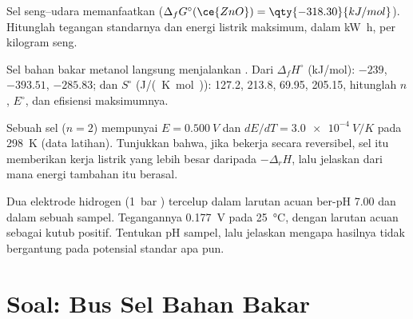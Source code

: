 \begin{exercise}[$\star\star$]\label{exo:b2:cell-thermodynamics:9}
Sel seng--udara memanfaatkan 
($\Delta_f G^\circ(\ce{ZnO}) =
\qty{-318.30}{kJ/mol}$). Hitunglah tegangan
standarnya dan energi listrik maksimum, dalam \unit{kW.h}, per kilogram
seng.
\end{exercise}

\begin{exercise}[$\star\star\star$]\label{exo:b2:cell-thermodynamics:10}
Sel bahan bakar metanol langsung menjalankan
. Dari $\Delta_f H^\circ$
(\unit{kJ/mol}):  $-239$,  $-393.51$, 
$-285.83$; dan $S^\circ$ (\unit{J/(K.mol)}):  127.2, 
213.8,  69.95,  205.15, hitunglah $n$, $E^\circ$, dan
efisiensi maksimumnya.
\end{exercise}

\begin{exercise}[$\star\star\star$]\label{exo:b2:cell-thermodynamics:11}
Sebuah sel ($n = 2$) mempunyai $E = \qty{0.500}{V}$ dan
$dE/dT = \qty{+3.0e-4}{V/K}$ pada \qty{298}{K} (data latihan). Tunjukkan
bahwa, jika bekerja secara reversibel, sel itu memberikan kerja listrik
yang lebih besar daripada $-\Delta_r H$, lalu jelaskan dari mana energi
tambahan itu berasal.
\end{exercise}

\begin{exercise}[$\star\star\star$]\label{exo:b2:cell-thermodynamics:12}
Dua elektrode hidrogen (\qty{1}{bar} ) tercelup dalam larutan acuan
ber-pH 7.00 dan dalam sebuah sampel. Tegangannya \qty{0.177}{V} pada
\qty{25}{\degreeCelsius}, dengan larutan acuan sebagai kutub positif.
Tentukan pH sampel, lalu jelaskan mengapa hasilnya tidak bergantung pada
potensial standar apa pun.
\end{exercise}

\section{Soal: Bus Sel Bahan Bakar}

